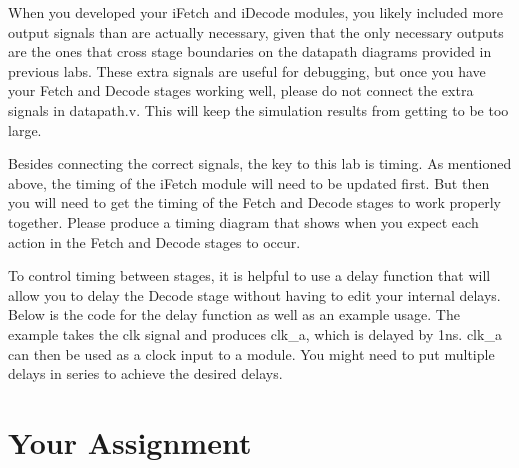 When you developed your iFetch and iDecode modules, you likely included more output signals than are actually necessary, given that the only necessary outputs are the ones that cross stage boundaries on the datapath diagrams provided in previous labs.  These extra signals are useful for debugging, but once you have your Fetch and Decode stages working well, please do not connect the extra signals in datapath.v.  This will keep the simulation results from getting to be too large.

Besides connecting the correct signals, the key to this lab is timing.  As mentioned above, the timing of the iFetch module will need to be updated first.  But then you will need to get the timing of the Fetch and Decode stages to work properly together.  Please produce a timing diagram that shows when you expect each action in the Fetch and Decode stages to occur.

To control timing between stages, it is helpful to use a delay function that will allow you to delay the Decode stage without having to edit your internal delays.  Below is the code for the delay function as well as an example usage.  The example takes the clk signal and produces clk\_a, which is delayed by 1ns.  clk\_a can then be used as a clock input to a module.  You might need to put multiple delays in series to achieve the desired delays.


\section{Your Assignment}

